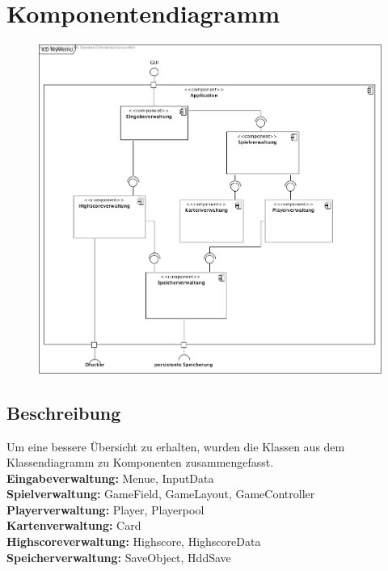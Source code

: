 \clearpage
\section{Komponentendiagramm}

\begin{figure}[!h]
	\centering
    \includegraphics[width=\textwidth]{./komponentendiagramm.png}
	\label{layout_gesamt}
\end{figure}
\subsection{Beschreibung}
Um eine bessere Übersicht zu erhalten, wurden die Klassen aus dem Klassendiagramm zu Komponenten zusammengefasst.\\

\noindent \textbf{Eingabeverwaltung: }Menue, InputData\\
\textbf{Spielverwaltung: }GameField, GameLayout, GameController\\
\textbf{Playerverwaltung: }Player, Playerpool\\
\textbf{Kartenverwaltung: }Card\\
\textbf{Highscoreverwaltung: }Highscore, HighscoreData\\
\textbf{Speicherverwaltung: }SaveObject, HddSave\\

